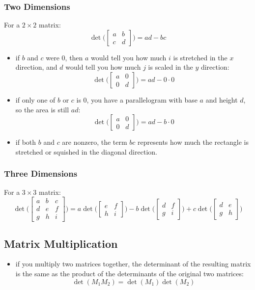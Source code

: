 \subsubsection{Two Dimensions}
For a $2 \times 2$ matrix:
$$ \det \Bigg( \begin{bmatrix} a & b \\ c & d \end{bmatrix} \Bigg) = ad - bc $$
\begin{itemize}
    \item if $b$ and $c$ were 0, then $a$ would tell you how much $i$ is stretched in the $x$ direction, and $d$ would tell you how much $j$ is scaled in the $y$ direction:
    $$ \det \Bigg( \begin{bmatrix} 
        a & 0 \\ 
        0 & d
    \end{bmatrix}\Bigg) = ad - 0 \cdot 0$$

    \item if only one of $b$ or $c$ is 0, you have a parallelogram with base $a$ and height $d$, so the area is still $ad$:
    $$ \det \Bigg( \begin{bmatrix} 
        a & 0 \\ 
        0 & d
    \end{bmatrix}\Bigg) = ad - b \cdot 0$$
    \item if both $b$ and $c$ are nonzero, the term $bc$ represents how much the rectangle is stretched or squished in the diagonal direction.
\end{itemize}

\subsubsection{Three Dimensions}
For a $3 \times 3$ matrix:
$$ \det \Bigg( \begin{bmatrix}
    a & b & c \\ 
    d & e & f \\ 
    g & h & i
\end{bmatrix}\Bigg) = 
a \det \Bigg( \begin{bmatrix}
    e & f \\ 
    h & i
\end{bmatrix} \Bigg) - b \det \Bigg( \begin{bmatrix}
    d & f \\ 
    g & i
\end{bmatrix} \Bigg) + c \det \Bigg( \begin{bmatrix}
    d & e \\ 
    g & h
\end{bmatrix} \Bigg)$$

\subsection{Matrix Multiplication}
\begin{itemize}
    \item if you multiply two matrices together, the determinant of the resulting matrix is the same as the product of the determinants of the original two matrices:
    $$ \det(M_1 M_2) = \det(M_1) \det(M_2) $$
\end{itemize}
